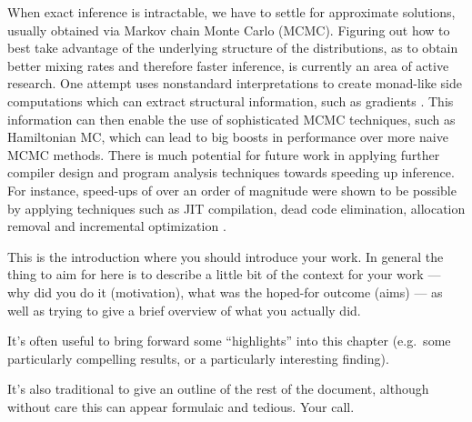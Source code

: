 When exact inference is intractable, we have to settle for approximate solutions, usually obtained via Markov chain Monte Carlo (MCMC). Figuring out how to best take advantage of the underlying structure
of the distributions, as to obtain better mixing rates and therefore faster inference, is currently an area of active research. One attempt uses nonstandard interpretations to create monad-like side computations which can extract structural information, such as gradients \cite{wingate2011nonstandard}. This information can then enable the use of sophisticated MCMC techniques, such as Hamiltonian MC, which can lead to big boosts in performance over more naive MCMC methods. There is much potential for future work in applying further compiler design and program analysis techniques towards speeding up inference. For instance, speed-ups of over an order of magnitude were shown to be possible by applying techniques such as JIT compilation, dead code elimination, allocation removal and incremental optimization \cite{yang2013incrementalizing}.


This is the introduction where you should introduce your work.  In
general the thing to aim for here is to describe a little bit of the
context for your work --- why did you do it (motivation), what was the
hoped-for outcome (aims) --- as well as trying to give a brief
overview of what you actually did.

It's often useful to bring forward some ``highlights'' into 
this chapter (e.g.\ some particularly compelling results, or 
a particularly interesting finding). 

It's also traditional to give an outline of the rest of the
document, although without care this can appear formulaic 
and tedious. Your call. 

